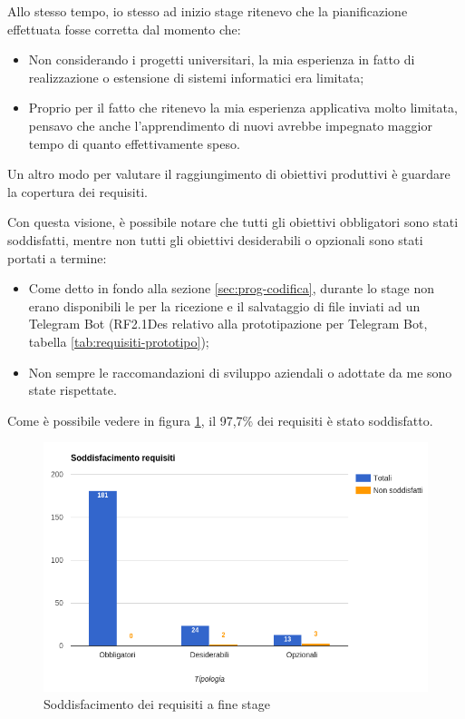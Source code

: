 Allo stesso tempo, io stesso ad inizio stage ritenevo che la pianificazione
effettuata fosse corretta dal momento che:

\begin{itemize}
\item Non considerando i progetti universitari, la mia esperienza in fatto di
  realizzazione o estensione di sistemi informatici era limitata;
\item Proprio per il fatto che ritenevo la mia esperienza applicativa molto
  limitata, pensavo che anche l'apprendimento di nuovi 
  avrebbe impegnato maggior tempo di quanto effettivamente speso.
\end{itemize}

Un altro modo per valutare il raggiungimento di obiettivi produttivi è guardare
la copertura dei requisiti.

Con questa visione, è possibile notare che tutti gli obiettivi obbligatori sono
stati soddisfatti, mentre non tutti gli obiettivi desiderabili o opzionali
sono stati portati a termine:

\begin{itemize}
\item Come detto in fondo alla sezione \ref{sec:prog-codifica}, durante lo
  stage non erano disponibili le  per la ricezione e il salvataggio
  di file inviati ad un Telegram Bot (RF2.1Des relativo alla prototipazione
  per Telegram Bot, tabella \ref{tab:requisiti-prototipo});
\item Non sempre le raccomandazioni di sviluppo aziendali o adottate da me sono
  state rispettate.
\end{itemize}

Come è possibile vedere in figura \ref{fig:requisiti-soddisfacimento}, il
97,7\% dei requisiti è stato soddisfatto.

\begin{figure}[H]%
\centering
\includegraphics[width=1.1\columnwidth]{immagini/requisiti}
\caption{Soddisfacimento dei requisiti a fine stage}
\label{fig:requisiti-soddisfacimento}%
\end{figure}

